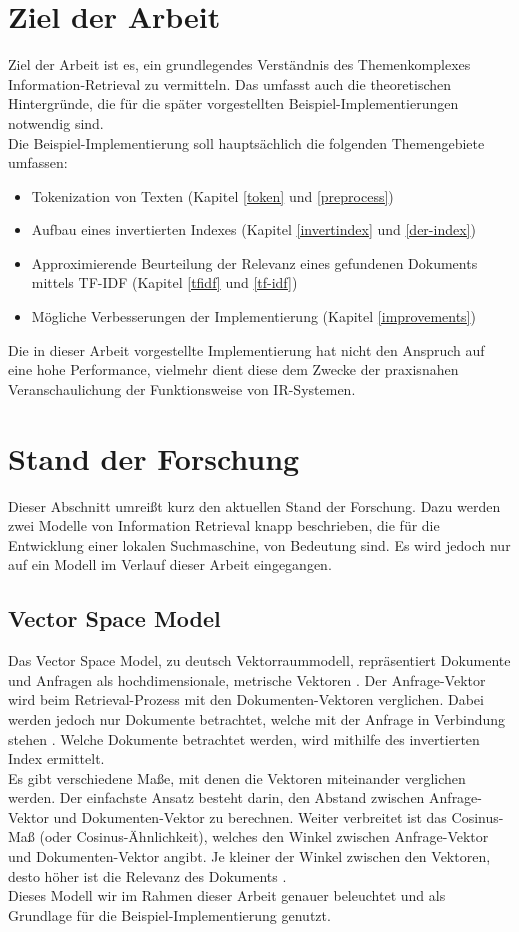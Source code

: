 \section{Ziel der Arbeit}
Ziel der Arbeit ist es, ein grundlegendes Verständnis des Themenkomplexes Information-Retrieval zu vermitteln. Das umfasst auch die theoretischen Hintergründe, die für die später vorgestellten Beispiel-Implementierungen notwendig sind.
\\
Die Beispiel-Implementierung soll hauptsächlich die folgenden Themengebiete umfassen:\\
\begin{itemize}
	\item Tokenization von Texten (Kapitel \ref{token} und \ref{preprocess})
	\item Aufbau eines invertierten Indexes (Kapitel \ref{invertindex} und \ref{der-index})
	\item Approximierende Beurteilung der Relevanz eines gefundenen Dokuments mittels TF-IDF (Kapitel \ref{tfidf} und \ref{tf-idf})
	\item Mögliche Verbesserungen der Implementierung (Kapitel \ref{improvements})
\end{itemize}
Die in dieser Arbeit vorgestellte Implementierung hat nicht den Anspruch auf eine hohe Performance, vielmehr dient diese dem Zwecke der praxisnahen Veranschaulichung der Funktionsweise von IR-Systemen.

\section{Stand der Forschung}
Dieser Abschnitt umreißt kurz den aktuellen Stand der Forschung. Dazu werden zwei Modelle von Information Retrieval knapp beschrieben, die für die Entwicklung einer lokalen Suchmaschine, von Bedeutung sind. Es wird jedoch nur auf ein Modell im Verlauf dieser Arbeit eingegangen.
\\

\subsection{Vector Space Model}
Das Vector Space Model, zu deutsch Vektorraummodell, repräsentiert Dokumente und Anfragen als hochdimensionale, metrische Vektoren \cite{VR_Retrieval}.
Der Anfrage-Vektor wird beim Retrieval-Prozess mit den Dokumenten-Vektoren verglichen. Dabei werden jedoch nur Dokumente betrachtet, welche mit der Anfrage in Verbindung stehen \cite{klass_IR}. Welche Dokumente betrachtet werden, wird mithilfe des invertierten Index ermittelt.
\\
Es gibt verschiedene Maße, mit denen die Vektoren miteinander verglichen werden. Der einfachste Ansatz besteht darin, den Abstand zwischen Anfrage-Vektor und Dokumenten-Vektor zu berechnen. Weiter verbreitet ist das Cosinus-Maß (oder Cosinus-Ähnlichkeit), welches den Winkel zwischen Anfrage-Vektor und Dokumenten-Vektor angibt. Je kleiner der Winkel zwischen den Vektoren, desto höher ist die Relevanz des Dokuments \cite{IR_Uni_Duisburg}.
\\
Dieses Modell wir im Rahmen dieser Arbeit genauer beleuchtet und als Grundlage für die Beispiel-Implementierung genutzt.

